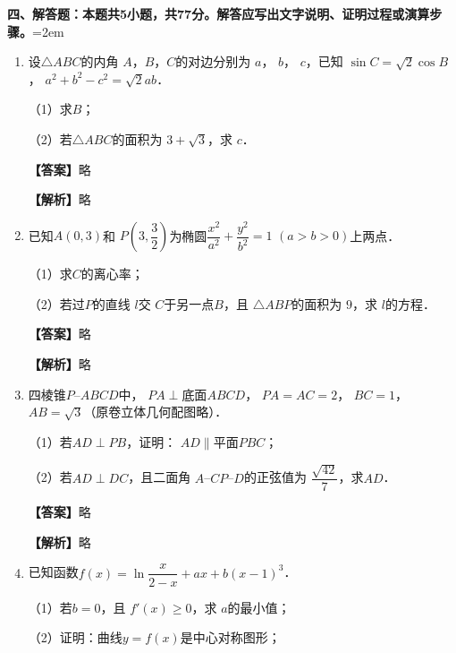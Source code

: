 \documentclass[UTF8,a4paper]{ctexart}
\begin{document}
\noindent\textbf{四、解答题：本题共5小题，共77分。解答应写出文字说明、证明过程或演算步骤。}\hangindent=2em
\par\medskip




\begin{enumerate}[series=s3, leftmargin=2em, itemsep=0.8em]


\item
设$\triangle ABC$的内角 $A$，$B$，$C$的对边分别为 $a$， $b$， $c$，已知 $\sin C=\sqrt 2\cos B$， $a^2+b^2-c^2=\sqrt 2 ab$．

（1）求$B$；

（2）若$\triangle ABC$的面积为 $3+\sqrt 3$，求 $c$．



\par\noindent\textbf{【答案】}略
\par\noindent\textbf{【解析】}略



\item
已知$A(0,3)$和 $P\left(3,\dfrac{3}{2}\right)$为椭圆$\dfrac{x^2}{a^2}+\dfrac{y^2}{b^2}=1$ $(a>b>0)$上两点．

（1）求$C$的离心率；

（2）若过$P$的直线 $l$交 $C$于另一点$B$，且 $\triangle ABP$的面积为 $9$，求 $l$的方程．



\par\noindent\textbf{【答案】}略
\par\noindent\textbf{【解析】}略



\item
四棱锥$P$--$ABCD$中， $PA\perp$底面$ABCD$， $PA=AC=2$， $BC=1$， $AB=\sqrt{3}$（原卷立体几何配图略）．

（1）若$AD\perp PB$，证明： $AD\parallel$平面$PBC$；

（2）若$AD\perp DC$，且二面角 $A$--$CP$--$D$的正弦值为 $\dfrac{\sqrt{42}}{7}$，求$AD$．



\par\noindent\textbf{【答案】}略
\par\noindent\textbf{【解析】}略



\item
已知函数$f(x)=\ln \dfrac{x}{2-x}+ax+b\left(x-1\right)^3$．

（1）若$b=0$，且 $f'(x)\geqslant 0$，求 $a$的最小值；

（2）证明：曲线$y=f(x)$是中心对称图形；


\end{enumerate}
\end{document}
